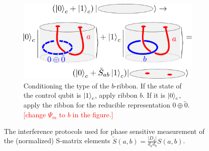 \documentclass[two column]{article}
\newcommand{\caro}[1]{\textcolor{red}{[#1]}}
\begin{document}
\begin{figure}
\vspace{15pt}

\begin{subfigure}{0.47\textwidth}
    \includegraphics[width=\linewidth]{Figures/intefFlav.pdf}
    \caption{Conditioning the type of the $b$-ribbon. If the state of the control qubit is $\ket{1}_c$, apply ribbon $b$. If it is $\ket{0}_c$, apply the ribbon for the reducible representation $0\oplus\tilde{0}$.\caro{change $\Psi_m$ to $b$ in the figure.}}
    \label{fig:cond_flav}
\end{subfigure}

\caption{The interference protocols used for phase sensitive measurement of the (normalized) S-matrix elements  $\tilde{S}(a,b) = \frac{|D_4|}{d_a d_b}S(a,b)$.}
\label{fig:S-mat}
\end{figure}
\end{document}

